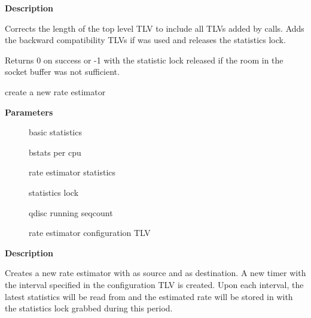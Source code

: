 \documentclass[a4paper,8pt,english]{sphinxmanual}
\begin{document}
\textbf{Description}

Corrects the length of the top level TLV to include all TLVs added
by  calls. Adds the backward compatibility TLVs
if {\hyperref[networking/kapi:c.gnet_stats_start_copy_compat]{\emph{}}} was used and releases the statistics
lock.

Returns 0 on success or -1 with the statistic lock released
if the room in the socket buffer was not sufficient.

\begin{fulllineitems}
\label{networking/kapi:c.gen_new_estimator}
create a new rate estimator

\end{fulllineitems}


\textbf{Parameters}
\begin{description}
\item[{}] \leavevmode
basic statistics

\item[{}] \leavevmode
bstats per cpu

\item[{}] \leavevmode
rate estimator statistics

\item[{}] \leavevmode
statistics lock

\item[{}] \leavevmode
qdisc running seqcount

\item[{}] \leavevmode
rate estimator configuration TLV

\end{description}

\textbf{Description}

Creates a new rate estimator with  as source and 
as destination. A new timer with the interval specified in the
configuration TLV is created. Upon each interval, the latest statistics
will be read from  and the estimated rate will be stored in
 with the statistics lock grabbed during this period.
\end{document}

